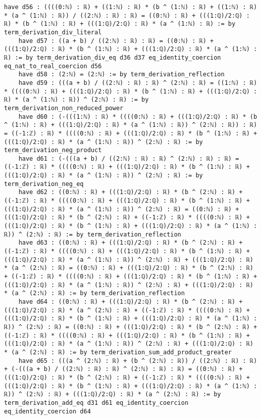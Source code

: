 \documentclass{article}
\begin{document}
\begin{tcolorbox}[colback=white!10, width=\linewidth]
\begin{lstlisting}[language=Lean4]
    have d56 : ((((0:ℕ) : ℝ) + ((1:ℕ) : ℝ) * (b ^ (1:ℕ) : ℝ) + ((1:ℕ) : ℝ) * (a ^ (1:ℕ) : ℝ)) / ((2:ℕ) : ℝ) : ℝ) = ((0:ℕ) : ℝ) + (((1:ℚ)/2:ℚ) : ℝ) * (b ^ (1:ℕ) : ℝ) + (((1:ℚ)/2:ℚ) : ℝ) * (a ^ (1:ℕ) : ℝ) := by term_derivation_div_literal
    have d57 : ((a + b) / ((2:ℕ) : ℝ) : ℝ) = ((0:ℕ) : ℝ) + (((1:ℚ)/2:ℚ) : ℝ) * (b ^ (1:ℕ) : ℝ) + (((1:ℚ)/2:ℚ) : ℝ) * (a ^ (1:ℕ) : ℝ) := by term_derivation_div_eq d36 d37 eq_identity_coercion eq_nat_to_real_coercion d56
    have d58 : (2:ℕ) = (2:ℕ) := by term_derivation_reflection
    have d59 : (((a + b) / ((2:ℕ) : ℝ) : ℝ) ^ (2:ℕ) : ℝ) = ((1:ℕ) : ℝ) * ((((0:ℕ) : ℝ) + (((1:ℚ)/2:ℚ) : ℝ) * (b ^ (1:ℕ) : ℝ) + (((1:ℚ)/2:ℚ) : ℝ) * (a ^ (1:ℕ) : ℝ)) ^ (2:ℕ) : ℝ) := by term_derivation_non_reduced_power
    have d60 : (-(((1:ℕ) : ℝ) * ((((0:ℕ) : ℝ) + (((1:ℚ)/2:ℚ) : ℝ) * (b ^ (1:ℕ) : ℝ) + (((1:ℚ)/2:ℚ) : ℝ) * (a ^ (1:ℕ) : ℝ)) ^ (2:ℕ) : ℝ)) : ℝ) = ((-1:ℤ) : ℝ) * ((((0:ℕ) : ℝ) + (((1:ℚ)/2:ℚ) : ℝ) * (b ^ (1:ℕ) : ℝ) + (((1:ℚ)/2:ℚ) : ℝ) * (a ^ (1:ℕ) : ℝ)) ^ (2:ℕ) : ℝ) := by term_derivation_neg_product
    have d61 : (-(((a + b) / ((2:ℕ) : ℝ) : ℝ) ^ (2:ℕ) : ℝ) : ℝ) = ((-1:ℤ) : ℝ) * ((((0:ℕ) : ℝ) + (((1:ℚ)/2:ℚ) : ℝ) * (b ^ (1:ℕ) : ℝ) + (((1:ℚ)/2:ℚ) : ℝ) * (a ^ (1:ℕ) : ℝ)) ^ (2:ℕ) : ℝ) := by term_derivation_neg_eq
    have d62 : ((0:ℕ) : ℝ) + (((1:ℚ)/2:ℚ) : ℝ) * (b ^ (2:ℕ) : ℝ) + ((-1:ℤ) : ℝ) * ((((0:ℕ) : ℝ) + (((1:ℚ)/2:ℚ) : ℝ) * (b ^ (1:ℕ) : ℝ) + (((1:ℚ)/2:ℚ) : ℝ) * (a ^ (1:ℕ) : ℝ)) ^ (2:ℕ) : ℝ) = ((0:ℕ) : ℝ) + (((1:ℚ)/2:ℚ) : ℝ) * (b ^ (2:ℕ) : ℝ) + ((-1:ℤ) : ℝ) * ((((0:ℕ) : ℝ) + (((1:ℚ)/2:ℚ) : ℝ) * (b ^ (1:ℕ) : ℝ) + (((1:ℚ)/2:ℚ) : ℝ) * (a ^ (1:ℕ) : ℝ)) ^ (2:ℕ) : ℝ) := by term_derivation_reflection
    have d63 : ((0:ℕ) : ℝ) + (((1:ℚ)/2:ℚ) : ℝ) * (b ^ (2:ℕ) : ℝ) + ((-1:ℤ) : ℝ) * ((((0:ℕ) : ℝ) + (((1:ℚ)/2:ℚ) : ℝ) * (b ^ (1:ℕ) : ℝ) + (((1:ℚ)/2:ℚ) : ℝ) * (a ^ (1:ℕ) : ℝ)) ^ (2:ℕ) : ℝ) + (((1:ℚ)/2:ℚ) : ℝ) * (a ^ (2:ℕ) : ℝ) = ((0:ℕ) : ℝ) + (((1:ℚ)/2:ℚ) : ℝ) * (b ^ (2:ℕ) : ℝ) + ((-1:ℤ) : ℝ) * ((((0:ℕ) : ℝ) + (((1:ℚ)/2:ℚ) : ℝ) * (b ^ (1:ℕ) : ℝ) + (((1:ℚ)/2:ℚ) : ℝ) * (a ^ (1:ℕ) : ℝ)) ^ (2:ℕ) : ℝ) + (((1:ℚ)/2:ℚ) : ℝ) * (a ^ (2:ℕ) : ℝ) := by term_derivation_reflection
    have d64 : ((0:ℕ) : ℝ) + (((1:ℚ)/2:ℚ) : ℝ) * (b ^ (2:ℕ) : ℝ) + (((1:ℚ)/2:ℚ) : ℝ) * (a ^ (2:ℕ) : ℝ) + ((-1:ℤ) : ℝ) * ((((0:ℕ) : ℝ) + (((1:ℚ)/2:ℚ) : ℝ) * (b ^ (1:ℕ) : ℝ) + (((1:ℚ)/2:ℚ) : ℝ) * (a ^ (1:ℕ) : ℝ)) ^ (2:ℕ) : ℝ) = ((0:ℕ) : ℝ) + (((1:ℚ)/2:ℚ) : ℝ) * (b ^ (2:ℕ) : ℝ) + ((-1:ℤ) : ℝ) * ((((0:ℕ) : ℝ) + (((1:ℚ)/2:ℚ) : ℝ) * (b ^ (1:ℕ) : ℝ) + (((1:ℚ)/2:ℚ) : ℝ) * (a ^ (1:ℕ) : ℝ)) ^ (2:ℕ) : ℝ) + (((1:ℚ)/2:ℚ) : ℝ) * (a ^ (2:ℕ) : ℝ) := by term_derivation_sum_add_product_greater
    have d65 : (((a ^ (2:ℕ) : ℝ) + (b ^ (2:ℕ) : ℝ)) / ((2:ℕ) : ℝ) : ℝ) + (-(((a + b) / ((2:ℕ) : ℝ) : ℝ) ^ (2:ℕ) : ℝ) : ℝ) = ((0:ℕ) : ℝ) + (((1:ℚ)/2:ℚ) : ℝ) * (b ^ (2:ℕ) : ℝ) + ((-1:ℤ) : ℝ) * ((((0:ℕ) : ℝ) + (((1:ℚ)/2:ℚ) : ℝ) * (b ^ (1:ℕ) : ℝ) + (((1:ℚ)/2:ℚ) : ℝ) * (a ^ (1:ℕ) : ℝ)) ^ (2:ℕ) : ℝ) + (((1:ℚ)/2:ℚ) : ℝ) * (a ^ (2:ℕ) : ℝ) := by term_derivation_add_eq d31 d61 eq_identity_coercion eq_identity_coercion d64

\end{lstlisting}
\end{tcolorbox}
\end{document}
